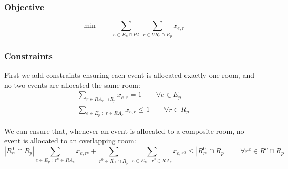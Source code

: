 \documentclass{article}
\theoremstyle{plain}
\numberwithin{theorem}{section}
\numberwithin{example}{section}
\theoremstyle{definition}
\begin{document}
\subsubsection*{Objective}
\begin{equation}
    \min \qquad \sum_{e \in E_p \cap P2} \
        \sum_{r \in UR_e \cap R_p} x_{e,r}
\end{equation}

\subsubsection*{Constraints}
First we add constraints ensuring each event is allocated exactly one room, and
no two events are allocated the same room:
\begin{gather}
    \sum_{r \in RA_e \cap R_p} x_{e,r} = 1 \qquad \forall e \in E_p \\
    \sum_{e \in E_p \; : \; r \in RA_e} x_{e, r} \leq 1 \qquad \forall r \in R_p
\end{gather}

We can ensure that, whenever an event is allocated to a composite room, no event
is allocated to an overlapping room:
\begin{equation}
    |R^0_{r^c} \cap R_p| \sum_{e \in E_p \; : \; r^c \in RA_e} x_{e, r^c}
        + \sum_{r^0 \in R^0_{r^c} \cap R_p} \ \sum_{e \in E_p \; : \; r^0 \in RA_e}
        x_{e, r^0} \leq |R^0_{r^c} \cap R_p| \qquad \forall r^c \in R^c \cap R_p
\end{equation}
\end{document}
